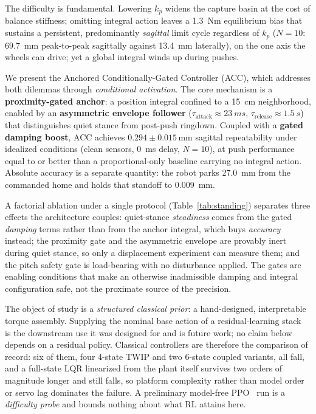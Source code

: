 \documentclass{jcd}
\begin{document}
The difficulty is fundamental. Lowering $k_p$ widens the capture basin at the cost of balance stiffness; omitting integral action leaves a \SI{1.3}{Nm} equilibrium bias that sustains a persistent, predominantly \emph{sagittal} limit cycle regardless of $k_p$ ($N{=}10$: \SI{69.7}{mm} peak-to-peak sagittally against \SI{13.4}{mm} laterally), on the one axis the wheels can drive; yet a global integral winds up during pushes.

We present the Anchored Conditionally-Gated Controller (ACC), which addresses both dilemmas through \emph{conditional activation}. The core mechanism is a \textbf{proximity-gated anchor}: a position integral confined to a \SI{15}{cm} neighborhood, enabled by an \textbf{asymmetric envelope follower} ($\tau_{\text{attack}}{\approx}\SI{23}{ms}$, $\tau_{\text{release}}{\approx}\SI{1.5}{s}$) that distinguishes quiet stance from post-push ringdown. Coupled with a \textbf{gated damping boost}, ACC achieves $0.294{\pm}0.015$\,mm sagittal repeatability under idealized conditions (clean sensors, \SI{0}{ms} delay, $N{=}10$), at push performance equal to or better than a proportional-only baseline carrying no integral action. Absolute accuracy is a separate quantity: the robot parks \SI{27.0}{mm} from the commanded home and holds that standoff to \SI{0.009}{mm}.

A factorial ablation under a single protocol (Table~\ref{tab:standing}) separates three effects the architecture couples: quiet-stance \emph{steadiness} comes from the gated \emph{damping} terms rather than from the anchor integral, which buys \emph{accuracy} instead; the proximity gate and the asymmetric envelope are provably inert during quiet stance, so only a displacement experiment can measure them; and the pitch safety gate is load-bearing with no disturbance applied. The gates are enabling conditions that make an otherwise inadmissible damping and integral configuration safe, not the proximate source of the precision.

The object of study is a \emph{structured classical prior}: a hand-designed, interpretable torque assembly. Supplying the nominal base action of a residual-learning stack~\citep{johannink2019residual} is the downstream use it was designed for and is future work; no claim below depends on a residual policy. Classical controllers are therefore the comparison of record: six of them, four 4-state TWIP and two 6-state coupled variants, all fall, and a full-state LQR linearized from the plant itself survives two orders of magnitude longer and still falls, so platform complexity rather than model order or servo lag dominates the failure. A preliminary model-free PPO~\citep{schulman2017ppo} run is a \emph{difficulty probe} and bounds nothing about what RL attains here.
\end{document}
